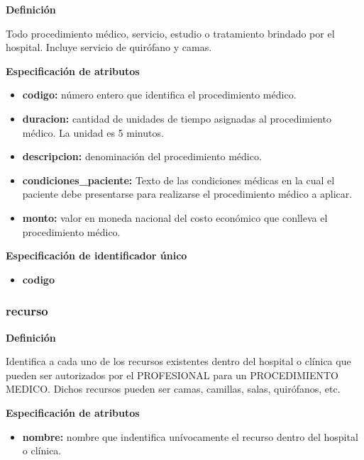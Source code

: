\documentclass[a4paper,11pt]{article}
\begin{document}
\textbf{Definición}

Todo procedimiento médico, servicio, estudio o tratamiento brindado por el hospital. 
Incluye servicio de quirófano y camas.

\textbf{Especificación de atributos}

\begin{itemize}

     \item \textbf{codigo:} número entero que identifica el procedimiento médico.

     \item \textbf{duracion:} cantidad de unidades de tiempo asignadas al procedimiento médico. La 
     unidad es 5 minutos.

     \item \textbf{descripcion:} denominación del procedimiento médico.

     \item \textbf{condiciones\_paciente:} Texto de las condiciones médicas en la cual el paciente 
     debe presentarse para realizarse el procedimiento médico a aplicar.

     \item \textbf{monto:} valor en moneda nacional del costo económico que conlleva el procedimiento médico.

\end{itemize}

\textbf{Especificación de identificador único}

\begin{itemize}

     \item \textbf{codigo}

\end{itemize}

\subsubsection{\textbf{recurso}}

\textbf{Definición}

Identifica a cada uno de los recursos existentes dentro del hospital o clínica
que pueden ser autorizados por el PROFESIONAL para un PROCEDIMIENTO MEDICO.
Dichos recursos pueden ser camas, camillas, salas, quirófanos, etc.

\textbf{Especificación de atributos}

\begin{itemize}

     \item \textbf{nombre:} nombre que indentifica unívocamente el recurso dentro del hospital o clínica.

\end{itemize}
\end{document}

